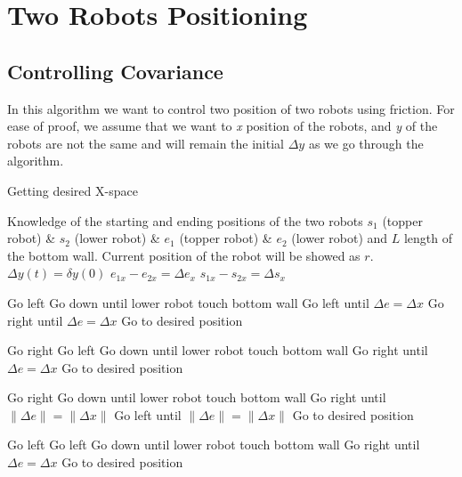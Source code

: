 
\section{Two Robots Positioning}\label{sec:algorithm}


\subsection{Controlling Covariance}

In this algorithm we want to control two position of two robots using friction. For ease of proof, we assume that we want to \emph{x} position of the robots, and \emph{y} of the robots are not the same and will remain the initial $\Delta y $ as we go through the algorithm.
\begin{algorithm}
\caption{Getting desired X-space}\label{alg:CovarianceControl}
\begin{algorithmic}[1]
\Require Knowledge of the starting and ending positions  of the two robots $s_1$ (topper robot) \& $s_2$ (lower robot)  \& $e_1$ (topper robot) \& $e_2$ (lower robot) and $L$ length of the bottom wall. Current position of the robot will be showed as $r$.
\Ensure $\Delta y(t) = \delta y(0)$ 
\State $e_{1x} - e_{2x} = \Delta e_x$
\State $s_{1x} - s_{2x} = \Delta s_x$
\Loop

\State Go left
\Endwhile
\State Go down until lower robot touch bottom wall
\state Go left until $\Delta e = \Delta x$
\Else Go right until $\Delta e = \Delta x$
\Endif
\State Go to desired position
\Endif

\State Go right
\Endwhile
{}
\State Go \epsilon left 
\endif
\State Go down until lower robot touch bottom wall
\state Go right until $\Delta e = \Delta x$
\State Go to desired position
\Endif

\State Go right
\Endwhile
\State Go down until lower robot touch bottom wall
\state Go right until $\|\Delta e\| = \|\Delta x\|$
\Else Go left until $\|\Delta e\| = \|\Delta x\|$
\Endif
\State Go to desired position
\Endif

\State Go left
\Endwhile
{}
\State Go \epsilon left 
\endif
\State Go down until lower robot touch bottom wall
\state Go right until $\Delta e = \Delta x$
\State Go to desired position
\Endif


\EndLoop
\end{algorithmic}
\end{algorithm}






